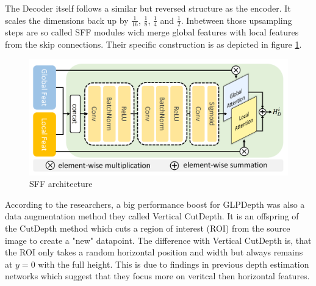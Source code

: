 The Decoder itself follows a similar but reversed structure as the encoder. It scales the dimensions back up by $\frac{1}{16}$, $\frac{1}{8}$, $\frac{1}{4}$ and $\frac{1}{2}$. Inbetween those upsampling steps are so called SFF modules wich merge global features with local features from the skip connections. Their specific construction is as depicted in figure \ref*{SFF_arch}.

\begin{figure}[ht]
    \begin{center}
        \includegraphics*[scale=.2, pagebox=artbox]{resources/SFF.png}
        \caption{SFF architecture \cite{kim2022global}} \label{SFF_arch}
    \end{center}
\end{figure}

According to the researchers, a big performance boost for GLPDepth was also a data augmentation method they called Vertical CutDepth. It is an offspring of the CutDepth method \cite{ishii} which cuts a region of interest (ROI) from the source image to create a "new" datapoint. The difference with Vertical CutDepth is, that the ROI only takes a random horizontal position and width but always remains at $y=0$ with the full height. This is due to findings \cite{dijk} in previous depth estimation networks which suggest that they focus more on veritcal then horizontal features.